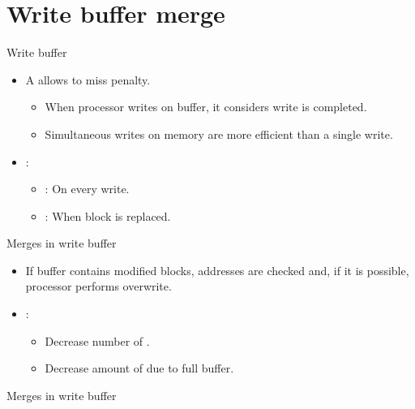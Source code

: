 \section{Write buffer merge}

\begin{frame}[t]{Write buffer}
\begin{itemize}
  \item A  allows to  miss penalty.
    \begin{itemize}
      \item When processor writes on buffer, it considers write is completed.
      \item Simultaneous writes on memory are more efficient than a single write.
    \end{itemize}

  \item {}:
    \begin{itemize}
      \item {}: On every write.
      \item {}: When block is replaced.
    \end{itemize}
\end{itemize}
\end{frame}

\begin{frame}[t]{Merges in write buffer}
\begin{itemize}
  \item If buffer contains modified blocks,
        addresses are checked and, if it is possible, processor performs overwrite.

  \item {}:
    \begin{itemize}
      \item Decrease number of .
      \item Decrease amount of  due to full buffer.
    \end{itemize}
\end{itemize}
\end{frame}

\begin{frame}[t]{Merges in write buffer}


\end{frame}
